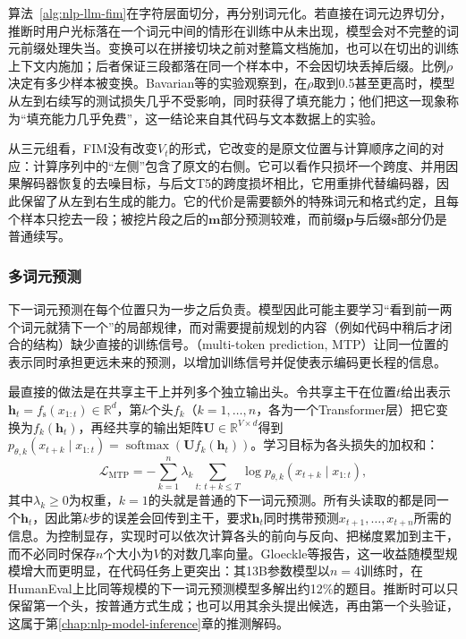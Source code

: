 算法~\ref{alg:nlp-llm-fim}在字符层面切分，再分别词元化。若直接在词元边界切分，推断时用户光标落在一个词元中间的情形在训练中从未出现，模型会对不完整的词元前缀处理失当。变换可以在拼接切块之前对整篇文档施加，也可以在切出的训练上下文内施加；后者保证三段都落在同一个样本中，不会因切块丢掉后缀。比例$\rho$决定有多少样本被变换。Bavarian等的实验观察到，在$\rho$取到0.5甚至更高时，模型从左到右续写的测试损失几乎不受影响，同时获得了填充能力；他们把这一现象称为“填充能力几乎免费”，这一结论来自其代码与文本数据上的实验。

从三元组看，FIM没有改变$V_t$的形式，它改变的是原文位置与计算顺序之间的对应：计算序列中的“左侧”包含了原文的右侧。它可以看作只损坏一个跨度、并用因果解码器恢复的去噪目标，与后文T5的跨度损坏相比，它用重排代替编码器，因此保留了从左到右生成的能力。它的代价是需要额外的特殊词元和格式约定，且每个样本只挖去一段；被挖片段之后的$\bm m$部分预测较难，而前缀$\bm p$与后缀$\bm s$部分仍是普通续写。

\subsubsection{多词元预测}
\label{sec:nlp-llm-objective-mtp}

下一词元预测在每个位置只为一步之后负责。模型因此可能主要学习“看到前一两个词元就猜下一个”的局部规律，而对需要提前规划的内容（例如代码中稍后才闭合的结构）缺少直接的训练信号。（multi-token prediction, MTP）让同一位置的表示同时承担更远未来的预测，以增加训练信号并促使表示编码更长程的信息。

最直接的做法是在共享主干上并列多个独立输出头。令共享主干在位置$t$给出表示$\bm h_t=f_{\mathrm s}(x_{1:t})\in\mathbb R^{d}$，第$k$个头$f_k$（$k=1,\ldots,n$，各为一个Transformer层）把它变换为$f_k(\bm h_t)$，再经共享的输出矩阵$\bm U\in\mathbb R^{V\times d}$得到$p_{\theta,k}(x_{t+k}\mid x_{1:t})=\operatorname{softmax}(\bm U f_k(\bm h_t))$。学习目标为各头损失的加权和：
\begin{equation}
 \mathcal L_{\mathrm{MTP}}=
 -\sum_{k=1}^{n}\lambda_k
 \sum_{t:\,t+k\leq T}
 \log p_{\theta,k}(x_{t+k}\mid x_{1:t}),
 \label{eq:nlp-llm-mtp}
\end{equation}
其中$\lambda_k\geq0$为权重，$k=1$的头就是普通的下一词元预测。所有头读取的都是同一个$\bm h_t$，因此第$k$步的误差会回传到主干，要求$\bm h_t$同时携带预测$x_{t+1},\ldots,x_{t+n}$所需的信息。为控制显存，实现时可以依次计算各头的前向与反向、把梯度累加到主干，而不必同时保存$n$个大小为$V$的对数几率向量。Gloeckle等报告，这一收益随模型规模增大而更明显，在代码任务上更突出：其13B参数模型以$n=4$训练时，在HumanEval上比同等规模的下一词元预测模型多解出约12\%的题目。推断时可以只保留第一个头，按普通方式生成；也可以用其余头提出候选，再由第一个头验证，这属于第\ref{chap:nlp-model-inference}章的推测解码。


